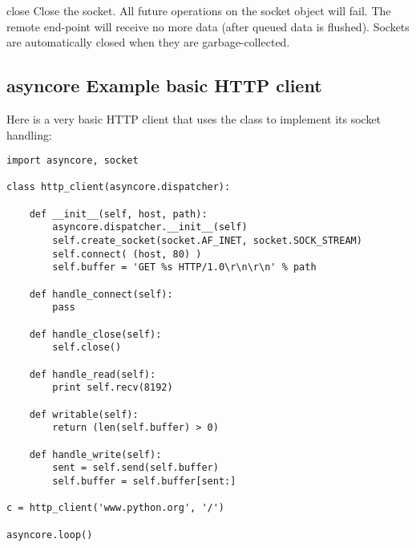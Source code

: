 \begin{methoddesc}{close}{}
  Close the socket.  All future operations on the socket object
  will fail.  The remote end-point will receive no more data (after
  queued data is flushed).  Sockets are automatically closed
  when they are garbage-collected.
\end{methoddesc}


\subsection{asyncore Example basic HTTP client \label{asyncore-example}}

Here is a very basic HTTP client that uses the 
class to implement its socket handling:

\begin{verbatim}
import asyncore, socket

class http_client(asyncore.dispatcher):

    def __init__(self, host, path):
        asyncore.dispatcher.__init__(self)
        self.create_socket(socket.AF_INET, socket.SOCK_STREAM)
        self.connect( (host, 80) )
        self.buffer = 'GET %s HTTP/1.0\r\n\r\n' % path

    def handle_connect(self):
        pass

    def handle_close(self):
        self.close()

    def handle_read(self):
        print self.recv(8192)

    def writable(self):
        return (len(self.buffer) > 0)

    def handle_write(self):
        sent = self.send(self.buffer)
        self.buffer = self.buffer[sent:]

c = http_client('www.python.org', '/')

asyncore.loop()
\end{verbatim}
